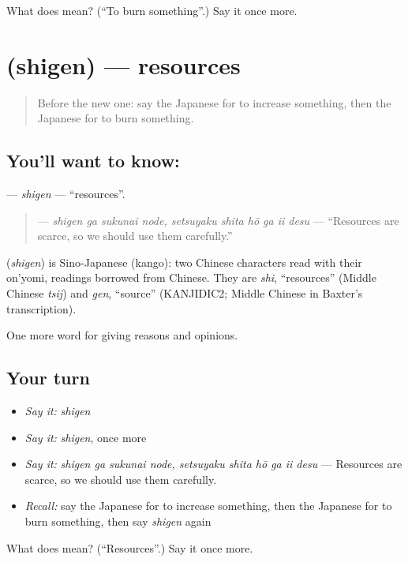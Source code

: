 \begin{tcolorbox}[breakable,colback=teal!4,colframe=teal!35!black,title={Before you move on}]
What does  mean? (\textquotedblleft{}To burn something\textquotedblright{}.) Say it once more.
\end{tcolorbox}
\section[\texorpdfstring{\ja{しげん} (shigen)}{しげん (shigen)}]{ (shigen) — resources}

\label{lesson:JA-C338-shigen}



\begin{quote}
Before the new one: say the Japanese for to increase something, then the Japanese for to burn something.
\end{quote}

\subsection*{You'll want to know: }
\textbf{} — \emph{shigen} — \textquotedblleft{}resources\textquotedblright{}.

\begin{quote}
\textbf{   } — \emph{shigen ga sukunai node, setsuyaku shita hō ga ii desu} — \textquotedblleft{}Resources are scarce, so we should use them carefully.\textquotedblright{}
\end{quote}

\begin{cousinweb}
\textbf{} (\emph{shigen}) is Sino-Japanese (kango): two Chinese characters read with their on'yomi, readings borrowed from Chinese. They are \emph{shi}, \textquotedblleft{}resources\textquotedblright{} (Middle Chinese \emph{tsij}) and \emph{gen}, \textquotedblleft{}source\textquotedblright{} (KANJIDIC2; Middle Chinese in Baxter's transcription).
\end{cousinweb}

\begin{grammarlens}[title={What you've built}]
One more word for giving reasons and opinions.
\end{grammarlens}

\subsection*{Your turn}
\begin{itemize}
\raggedright
  \item \emph{Say it:} \emph{shigen}
  \item \emph{Say it:} \emph{shigen}, once more
  \item \emph{Say it:} \emph{shigen ga sukunai node, setsuyaku shita hō ga ii desu} — Resources are scarce, so we should use them carefully.
  \item \emph{Recall:} say the Japanese for to increase something, then the Japanese for to burn something, then say \emph{shigen} again
\end{itemize}

\begin{tcolorbox}[breakable,colback=teal!4,colframe=teal!35!black,title={Before you move on}]
What does  mean? (\textquotedblleft{}Resources\textquotedblright{}.) Say it once more.
\end{tcolorbox}
